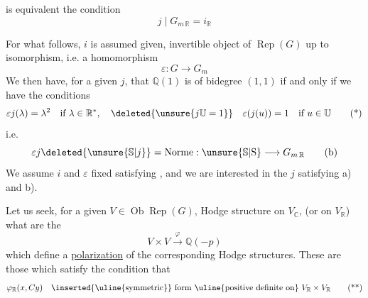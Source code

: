 is equivalent  the condition
\[
j\mid G_{m\,\mathbb{R}}=i_{\mathbb{R}}\tag*{(a)}
\]

For what follows, $i$ is assumed given,  invertible object  of $\operatorname{Rep}(G)$ up to isomorphism, i.e. a homomorphism \unsure{$\varepsilon$}
\[
\varepsilon:G\longrightarrow G_m
\]
We then have, for a given $j$, that $\mathbb{Q}(1)$ is of bidegree $(1,1)$ if and only if we have the conditions
\[
\varepsilon j(\lambda)=\lambda^2\quad\text{if }\lambda\in\mathbb{R}^{*},\quad
\deleted{\unsure{j\mathbb{U}=1}}\quad
\varepsilon(j(u))=1\quad\text{if }u\in\mathbb{U}\tag*{(*)}
\]
i.e.
\[
\varepsilon j\deleted{\unsure{\mathbb{S}|j}}=\mathrm{Norme}:\unsure{\mathbb{S}|\mathrm{S}}\longrightarrow G_{m\,\mathbb{R}}\tag*{(b)}
\]
We assume $i$ and $\varepsilon$ fixed satisfying , and we are interested in the $j$ satisfying a) and b).

 Let us seek, for a given $V\in\operatorname{Ob}\operatorname{Rep}(G)$,  Hodge structure on $V_{\mathbb{C}}$, (or on $V_{\mathbb{R}}$) what are the 
\[
V\times V\xrightarrow{\varphi}\mathbb{Q}(-p)
\]
which define a \uline{polarization} of the corresponding Hodge structures. These are those which satisfy  the condition that
\[
\varphi_{\mathbb{R}}(x,Cy)\quad\text{\inserted{\uline{symmetric}} form \uline{positive definite on} } V_{\mathbb{R}}\times V_{\mathbb{R}}\tag*{(**)}
\]
